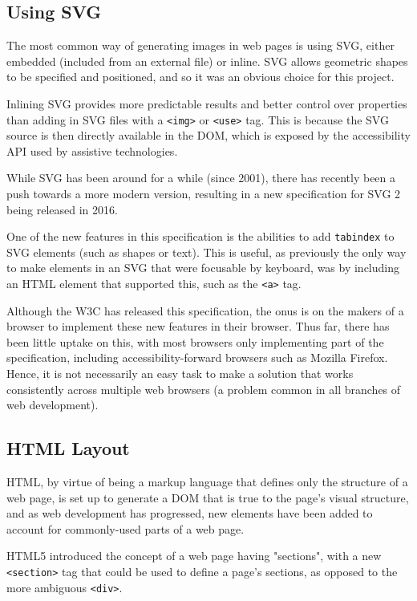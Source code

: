 \documentclass[ %
                    author={Aleena Baig},
                supervisor={Dr Simon Lock},
                    degree={BSc},
                     title={On Making Web Accessible Graphs},
                  subtitle={},
                      year={2019} ]{dissertation}
\begin{document}
\subsection{Using SVG}

The most common way of generating images in web pages is using SVG, either embedded (included from an external file) or inline. SVG allows geometric shapes to be specified and positioned, and so it was an obvious choice for this project.

Inlining SVG provides more predictable results and better control over properties than adding in SVG files with a \texttt{<img>} or \texttt{<use>} tag. This is because the SVG source is then directly available in the DOM, which is exposed by the accessibility API used by assistive technologies.

While SVG has been around for a while (since 2001), there has recently been a push towards a more modern version, resulting in a new specification for SVG 2 being released in 2016.

One of the new features in this specification is the abilities to add \texttt{tabindex} to SVG elements (such as shapes or text). This is useful, as previously the only way to make elements in an SVG that were focusable by keyboard, was by including an HTML element that supported this, such as the \texttt{<a>} tag.

Although the W3C has released this specification, the onus is on the makers of a browser to implement these new features in their browser. Thus far, there has been little uptake on this, with most browsers only implementing part of the specification, including accessibility-forward browsers such as Mozilla Firefox. Hence, it is not necessarily an easy task to make a solution that works consistently across multiple web browsers (a problem common in all branches of web development).

\subsection{HTML Layout}

HTML, by virtue of being a markup language that defines only the structure of a web page, is set up to generate a DOM that is true to the page's visual structure, and as web development has progressed, new elements have been added to account for commonly-used parts of a web page.

HTML5 introduced the concept of a web page having "sections", with a new \texttt{<section>} tag that could be used to define a page's sections, as opposed to the more ambiguous \texttt{<div>}.
\end{document}
